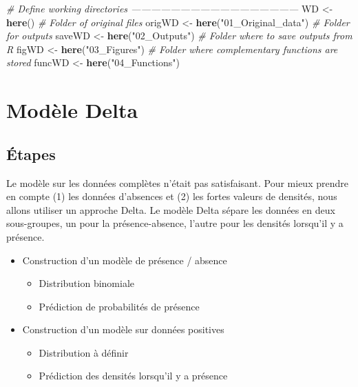 \documentclass[french,a4paper]{article}
\newenvironment{Shaded}{\begin{snugshade}}{\end{snugshade}}
\newcommand{\CommentTok}[1]{\textcolor[rgb]{0.56,0.35,0.01}{\textit{#1}}}
\newcommand{\KeywordTok}[1]{\textcolor[rgb]{0.13,0.29,0.53}{\textbf{#1}}}
\newcommand{\NormalTok}[1]{#1}
\newcommand{\StringTok}[1]{\textcolor[rgb]{0.31,0.60,0.02}{#1}}
\providecommand{\tightlist}{%
  \setlength{\itemsep}{0pt}\setlength{\parskip}{0pt}}
\begin{document}
\begin{Shaded}
\begin{Highlighting}[]
\CommentTok{# Define working directories ---------------------------------------------------}
\NormalTok{WD <-}\StringTok{ }\KeywordTok{here}\NormalTok{()}
\CommentTok{# Folder of original files}
\NormalTok{origWD <-}\StringTok{ }\KeywordTok{here}\NormalTok{(}\StringTok{"01_Original_data"}\NormalTok{)}
\CommentTok{# Folder for outputs}
\NormalTok{saveWD <-}\StringTok{ }\KeywordTok{here}\NormalTok{(}\StringTok{"02_Outputs"}\NormalTok{)}
\CommentTok{# Folder where to save outputs from R}
\NormalTok{figWD <-}\StringTok{ }\KeywordTok{here}\NormalTok{(}\StringTok{"03_Figures"}\NormalTok{)}
\CommentTok{# Folder where complementary functions are stored}
\NormalTok{funcWD <-}\StringTok{ }\KeywordTok{here}\NormalTok{(}\StringTok{"04_Functions"}\NormalTok{)}
\end{Highlighting}
\end{Shaded}

\hypertarget{modele-delta}{%
\section{Modèle Delta}\label{modele-delta}}

\hypertarget{etapes}{%
\subsection{Étapes}\label{etapes}}

Le modèle sur les données complètes n'était pas satisfaisant. Pour mieux prendre en compte (1) les données d'absences et (2) les fortes valeurs de densités, nous allons utiliser un approche Delta. Le modèle Delta sépare les données en deux sous-groupes, un pour la présence-absence, l'autre pour les densités lorsqu'il y a présence.

\begin{itemize}
\tightlist
\item
  Construction d'un modèle de présence / absence

  \begin{itemize}
  \tightlist
  \item
    Distribution binomiale
  \item
    Prédiction de probabilités de présence
  \end{itemize}
\item
  Construction d'un modèle sur données positives

  \begin{itemize}
  \tightlist
  \item
    Distribution à définir
  \item
    Prédiction des densités lorsqu'il y a présence
  \end{itemize}
\end{itemize}
\end{document}
